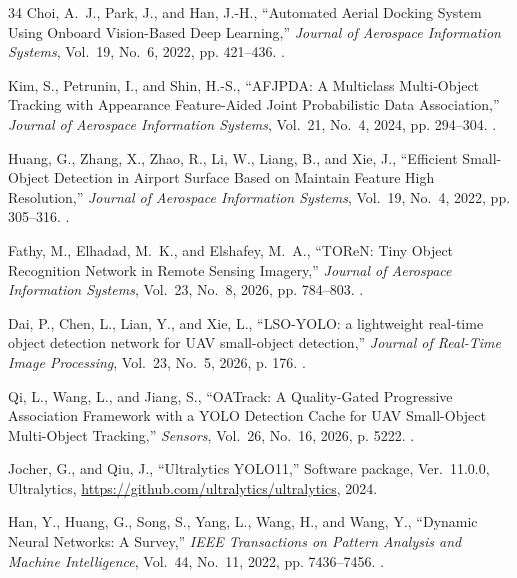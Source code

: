 \documentclass[journal]{new-aiaa}
\begin{document}
\begin{thebibliography}{34}
Choi, A.~J., Park, J., and Han, J.-H., \enquote{{Automated Aerial Docking
  System Using Onboard Vision-Based Deep Learning},} \emph{Journal of Aerospace
  Information Systems}, Vol.~19, No.~6, 2022, pp. 421--436.
\newblock {}.

Kim, S., Petrunin, I., and Shin, H.-S., \enquote{{AFJPDA: A Multiclass
  Multi-Object Tracking with Appearance Feature-Aided Joint Probabilistic Data
  Association},} \emph{Journal of Aerospace Information Systems}, Vol.~21,
  No.~4, 2024, pp. 294--304.
\newblock {}.

Huang, G., Zhang, X., Zhao, R., Li, W., Liang, B., and Xie, J.,
  \enquote{{Efficient Small-Object Detection in Airport Surface Based on
  Maintain Feature High Resolution},} \emph{Journal of Aerospace Information
  Systems}, Vol.~19, No.~4, 2022, pp. 305--316.
\newblock {}.

Fathy, M., Elhadad, M.~K., and Elshafey, M.~A., \enquote{{TOReN: Tiny Object
  Recognition Network in Remote Sensing Imagery},} \emph{Journal of Aerospace
  Information Systems}, Vol.~23, No.~8, 2026, pp. 784--803.
\newblock {}.

Dai, P., Chen, L., Lian, Y., and Xie, L., \enquote{{LSO-YOLO: a lightweight
  real-time object detection network for UAV small-object detection},}
  \emph{Journal of Real-Time Image Processing}, Vol.~23, No.~5, 2026, p. 176.
\newblock {}.

Qi, L., Wang, L., and Jiang, S., \enquote{{OATrack: A Quality-Gated Progressive
  Association Framework with a YOLO Detection Cache for UAV Small-Object
  Multi-Object Tracking},} \emph{Sensors}, Vol.~26, No.~16, 2026, p. 5222.
\newblock {}.

Jocher, G., and Qiu, J., \enquote{{Ultralytics YOLO11},} Software package,
  Ver.~11.0.0, Ultralytics, \url{https://github.com/ultralytics/ultralytics},
  2024.

Han, Y., Huang, G., Song, S., Yang, L., Wang, H., and Wang, Y.,
  \enquote{{Dynamic Neural Networks: A Survey},} \emph{IEEE Transactions on
  Pattern Analysis and Machine Intelligence}, Vol.~44, No.~11, 2022, pp.
  7436--7456.
\newblock {}.


\end{thebibliography}
\end{document}
